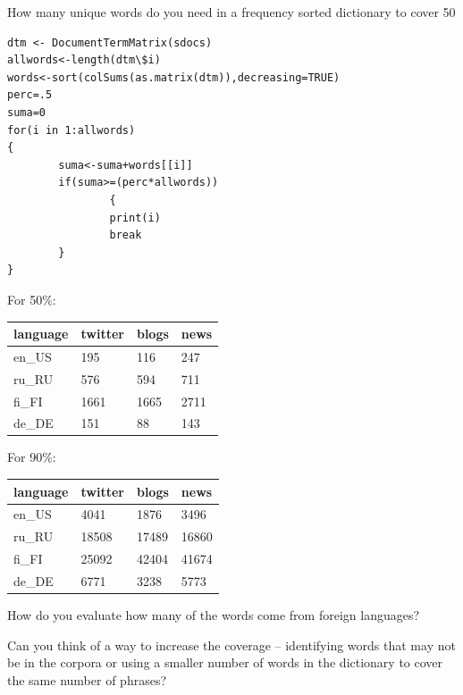 \documentclass{article}
\begin{document}
How many unique words do you need in a frequency sorted dictionary to cover 50%

\begin{lstlisting}
dtm <- DocumentTermMatrix(sdocs)
allwords<-length(dtm\$i)
words<-sort(colSums(as.matrix(dtm)),decreasing=TRUE)
perc=.5
suma=0
for(i in 1:allwords)
{
        suma<-suma+words[[i]]
        if(suma>=(perc*allwords))
                {
                print(i)
                break
        }
}
\end{lstlisting}

For 50\%:

\begin{center}
    \begin{tabular}{ | l | l | l | l |}
    \hline
    language & twitter & blogs & news \\ \hline
    en\_US &  195  & 116 &  247 \\ \hline
    ru\_RU &  576  & 594 &  711  \\ \hline
    fi\_FI &  1661 & 1665 & 2711  \\ \hline
    de\_DE &  151  & 88 &  143  \\ \hline
    \end{tabular}
\end{center}

For 90\%:

\begin{center}
    \begin{tabular}{ | l | l | l | l |}
    \hline
    language & twitter & blogs & news \\ \hline
    en\_US & 4041 & 1876 & 3496 \\ \hline
    ru\_RU & 18508 & 17489 & 16860 \\ \hline
    fi\_FI & 25092 & 42404 & 41674 \\ \hline
    de\_DE & 6771 & 3238 & 5773 \\ \hline
    \end{tabular}
\end{center}

How do you evaluate how many of the words come from foreign languages? 

Can you think of a way to increase the coverage -- identifying words that may not be in the corpora or using a smaller number of words in the dictionary to cover the same number of phrases?
\end{document}
